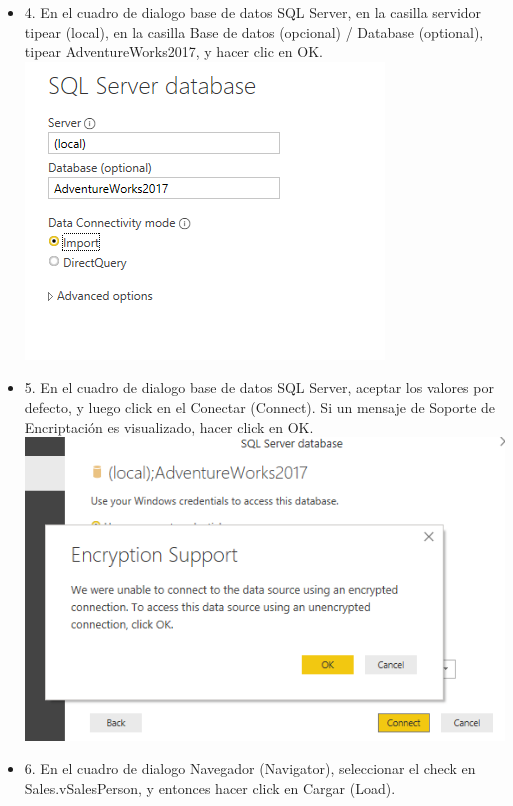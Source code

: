 \begin{itemize}
\item 4. En el cuadro de dialogo base de datos SQL Server, en la casilla servidor tipear (local), en la casilla Base de datos (opcional) / Database (optional), tipear AdventureWorks2017, y hacer clic en OK. \\
\includegraphics[scale=0.8]{./Imagenes/image003}
\item 5. En el cuadro de dialogo base de datos SQL Server, aceptar los valores por defecto, y luego click en el Conectar (Connect). Si un mensaje de Soporte de Encriptación es visualizado, hacer click en OK. \\
\includegraphics[scale=0.5]{./Imagenes/image004}
\item 6. En el cuadro de dialogo Navegador (Navigator), seleccionar el check en Sales.vSalesPerson, y entonces hacer click en Cargar (Load). \\

\end{itemize}
